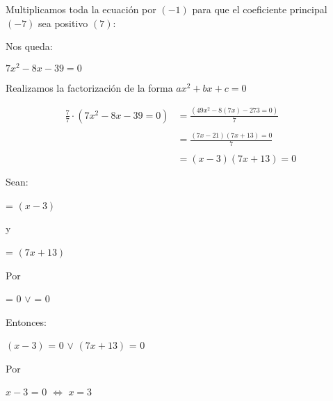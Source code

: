 \documentclass[12pt]{article}
\begin{document}
Multiplicamos toda la ecuación por $(-1)$ para que el coeficiente principal $(-7)$ sea positivo $(7)$: \\
\begin{center}
    Nos queda:
\end{center}

\begin{center}
    $7x^{2} -8x-39 = 0$ 
\end{center} 
    
Realizamos la factorización de la forma $ax^{2} + bx + c = 0$

\begin{equation*}
    \begin{split}
      \frac{7}{7}\cdot(7x^{2} -8x-39 = 0) & = \frac{(49x^{2}-8(7x)-273 = 0)}{7} \\\\
      & = \frac{(7x-21)(7x+13)=0}{7} \\\\
      & = {(x-3)(7x+13)=0} \\\\
    \end{split}
\end{equation*}
Sean: 
\begin{center}
   {} = $(x-3)$   
\end{center}

\begin{center}
    y
\end{center}

\begin{center}
   {} = $(7x+13)$   
\end{center}
    
Por {}
\begin{center}
   {} = $0$  $\vee$ {} = $0$   
\end{center}

Entonces:

\begin{center}
   
   $(x-3)$ = $0$  $\vee$ $(7x+13)$ = $0$   
   
\end{center}

Por {}

\begin{center}
   
   $x-3$ = $0$ $\Leftrightarrow$ $ x=3 $ 
   
\end{center}
\end{document}

